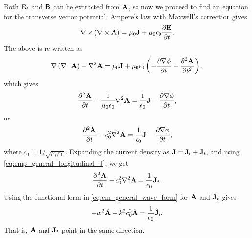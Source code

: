 \documentclass[a4paper,11pt]{report}
\begin{document}
Both $\mathbf{E}_t$ and $\mathbf{B}$ can be extracted from $\mathbf{A}$, so now we proceed to find an equation for the transverse vector potential. Ampere's law with Maxwell's correction gives
\begin{equation*}
    \nabla \times \left ( \nabla \times \mathbf{A} \right ) = \mu_0 \mathbf{J} + \mu_0 \epsilon_0 \frac{\partial \mathbf{E}}{\partial t}.
\end{equation*}
The above is re-written as
\begin{equation*}
    \nabla \left ( \nabla \cdot \mathbf{A} \right ) - \nabla^2 \mathbf{A} = \mu_0 \mathbf{J} + \mu_0 \epsilon_0 \left ( -\frac{\partial \nabla \phi}{\partial t} - \frac{\partial^2 \mathbf{A}}{\partial t^2} \right ),
\end{equation*}
which gives
\begin{equation*}
    \frac{\partial^2 \mathbf{A}}{\partial t} - \frac{1}{\mu_0 \epsilon_0} \nabla^2 \mathbf{A} = \frac{1}{\epsilon_0} \mathbf{J} - \frac{\partial \nabla \phi}{\partial t},
\end{equation*}
or
\begin{equation*}
    \frac{\partial^2 \mathbf{A}}{\partial t} - c_0^2 \nabla^2 \mathbf{A} = \frac{1}{\epsilon_0} \mathbf{J} - \frac{\partial \nabla \phi}{\partial t},
\end{equation*}
where $c_0 = 1/\sqrt{\mu_0 \epsilon_0}$. Expanding the current density as $\mathbf{J} = \mathbf{J}_l + \mathbf{J}_t$, and using \cref{eq:emp_general_longitudinal_J}, we get
\begin{equation}
    \label{eq:emp_general_trans_vec_pot}
    \frac{\partial^2 \mathbf{A}}{\partial t} - c_0^2 \nabla^2 \mathbf{A} = \frac{1}{\epsilon_0} \mathbf{J}_t.
\end{equation}
Using the functional form in \cref{eq:em_general_wave_form} for $\mathbf{A}$ and $\mathbf{J}_t$ gives
\begin{equation}
    -w^2 \hat{\mathbf{A}} + k^2 c_0^2 \hat{\mathbf{A}}= \frac{1}{\epsilon_0} \hat{\mathbf{J}}_t.
\end{equation}
That is, $\mathbf{A}$ and $\mathbf{J}_t$ point in the same direction.
\end{document}
